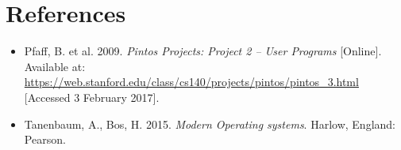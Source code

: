 \documentclass{article}
\begin{document}
\newpage

\section{References}
\label{sec:references}

\begin{itemize}
    \item Pfaff, B. et al. 2009. \textit{Pintos Projects: Project 2 -- User Programs} [Online]. Available at: \url{https://web.stanford.edu/class/cs140/projects/pintos/pintos_3.html} [Accessed 3 February 2017].

    \item Tanenbaum, A., Bos, H. 2015. \textit{Modern Operating systems}. Harlow, England: Pearson.
\end{itemize}
\end{document}

